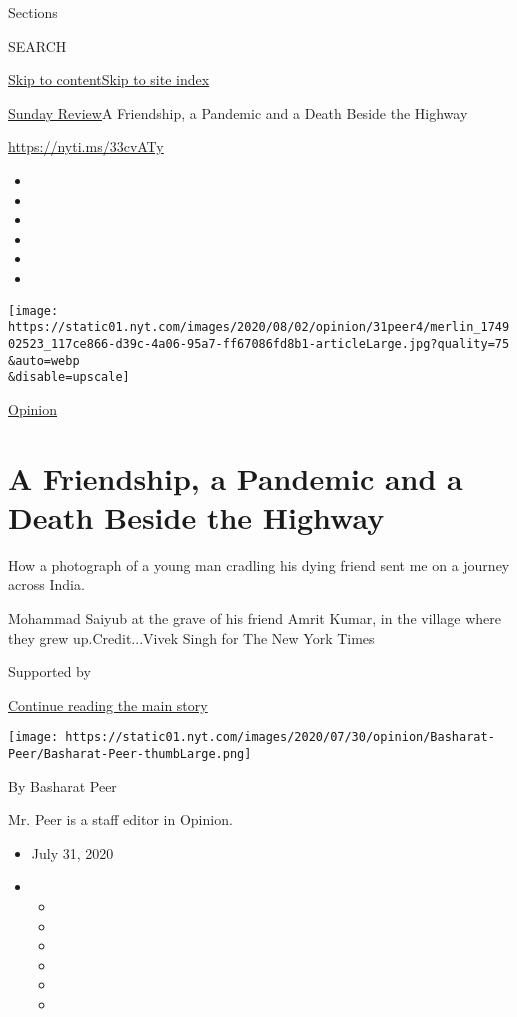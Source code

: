 Sections

SEARCH

\protect\hyperlink{site-content}{Skip to
content}\protect\hyperlink{site-index}{Skip to site index}

\href{/section/opinion/sunday}{Sunday Review}\textbar{}A Friendship, a
Pandemic and a Death Beside the Highway

\url{https://nyti.ms/33cvATy}

\begin{itemize}
\item
\item
\item
\item
\item
\item
\end{itemize}

\texttt{[image: https://static01.nyt.com/images/2020/08/02/opinion/31peer4/merlin\_174902523\_117ce866-d39c-4a06-95a7-ff67086fd8b1-articleLarge.jpg?quality=75\\\&auto=webp\\\&disable=upscale]}

\href{/section/opinion}{Opinion}

\hypertarget{a-friendship-a-pandemic-and-a-death-beside-the-highway}{%
\section{A Friendship, a Pandemic and a Death Beside the
Highway}\label{a-friendship-a-pandemic-and-a-death-beside-the-highway}}

How a photograph of a young man cradling his dying friend sent me on a
journey across India.

Mohammad Saiyub at the grave of his friend Amrit Kumar, in the village
where they grew up.Credit...Vivek Singh for The New York Times

Supported by

\protect\hyperlink{after-sponsor}{Continue reading the main story}

\texttt{[image: https://static01.nyt.com/images/2020/07/30/opinion/Basharat-Peer/Basharat-Peer-thumbLarge.png]}

By Basharat Peer

Mr. Peer is a staff editor in Opinion.

\begin{itemize}
\item
  July 31, 2020
\item
  \begin{itemize}
  \item
  \item
  \item
  \item
  \item
  \item
  \end{itemize}
\end{itemize}

